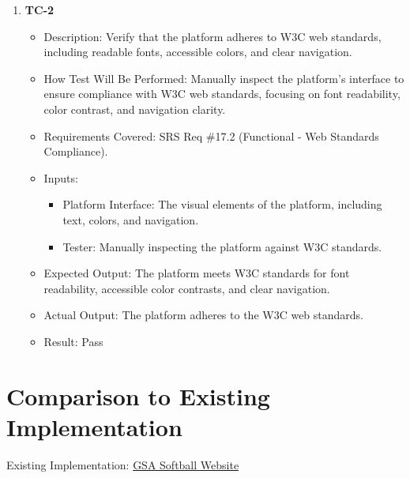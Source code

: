 \documentclass[12pt, titlepage]{article}
\begin{document}
\begin{enumerate}
    \item \textbf{TC-2}  
    \begin{itemize}
        \item Description: Verify that the platform adheres to W3C web standards, including readable fonts, accessible colors, and clear navigation.
        \item How Test Will Be Performed: Manually inspect the platform's interface to ensure compliance with W3C web standards, focusing on font readability, color contrast, and navigation clarity.
        \item Requirements Covered: SRS Req \#17.2 (Functional - Web Standards Compliance).
        \item Inputs:  
            \begin{itemize}
                \item Platform Interface: The visual elements of the platform, including text, colors, and navigation.
                \item Tester: Manually inspecting the platform against W3C standards.
            \end{itemize}
        \item Expected Output: The platform meets W3C standards for font readability, accessible color contrasts, and clear navigation.
        \item Actual Output: The platform adheres to the W3C web standards.
        \item Result: Pass
    \end{itemize}

\end{enumerate}
	
\section{Comparison to Existing Implementation}	

Existing Implementation: \href{https://www.gsasoftball.ca/}{GSA Softball Website}
\end{document}
